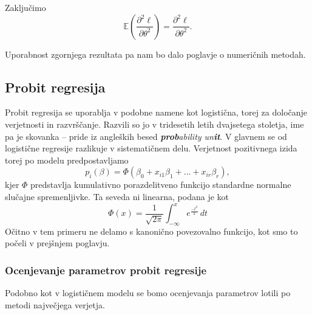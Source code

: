 \documentclass[12pt,a4paper]{amsart}
\theoremstyle{definition} %
\theoremstyle{plain} %
\begin{document}
Zaključimo
\begin{equation}\label{pv2odv}    
    \mathbb{E}\left(\frac{\partial^2\ell}{\partial\theta^2}\right) = \frac{\partial^2\ell}{\partial\theta^2}.
\end{equation}

Uporabnost zgornjega rezultata pa nam bo dalo poglavje o numeričnih metodah.

%
\subsection{Probit regresija}
Probit regresija se uporablja v podobne namene kot logistična, torej za določanje verjetnosti in razvrščanje. Razvili so jo v tridesetih letih
dvajsetega stoletja, ime pa je skovanka -- pride iz angleških besed \textit{\textbf{prob}ability un\textbf{it}}. V glavnem se od logistične regresije
razlikuje v sistematičnem delu. Verjetnost pozitivnega izida torej po modelu predpostavljamo
\begin{equation}
    p_{i}(\beta) = \Phi (\beta_{0} + x_{i1}\beta_{1} + \ldots + x_{ir}\beta_{r}),
\end{equation}
kjer $\Phi$ predstavlja kumulativno porazdelitveno funkcijo standardne normalne slučajne spremenljivke. Ta seveda ni linearna,
podana je kot 
\[
    \Phi(x) = \frac{1}{\sqrt{2\pi}}\int_{-\infty}^{x}e^{\frac{-t^2}{2}}\,dt
\]
Očitno v tem primeru ne delamo s kanonično povezovalno funkcijo, kot smo to počeli v prejšnjem poglavju.

\subsubsection{Ocenjevanje parametrov probit regresije}\label{ocenpar_probit}
Podobno kot v logističnem modelu se bomo ocenjevanja parametrov lotili po metodi največjega verjetja.
\end{document}
